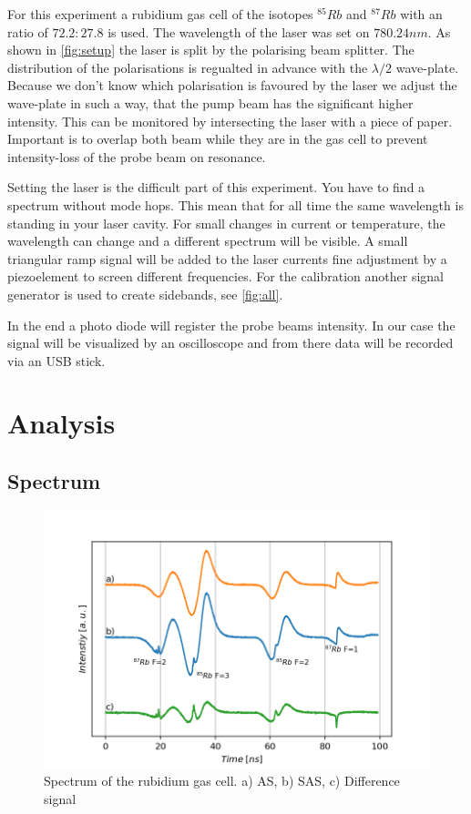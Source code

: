 \documentclass[]{article}
\begin{document}
For this experiment a rubidium gas cell of the isotopes $^{85}Rb$ and $^{87}Rb$ with an ratio of $72.2 : 27.8$ is used. The wavelength of the laser was set on $780.24nm$. As shown in \autoref{fig:setup} the laser is split by the polarising beam splitter. The distribution of the polarisations is regualted in advance with the $\lambda/2$ wave-plate. Because we don't know which polarisation is favoured by the laser we adjust the wave-plate in such a way, that the pump beam has the significant higher intensity. This can be monitored by intersecting the laser with a piece of paper. Important is to overlap both beam while they are in the gas cell to prevent intensity-loss of the probe beam on resonance.

Setting the laser is the difficult part of this experiment. You have to find a spectrum without mode hops. This mean that for all time the same wavelength is standing in your laser cavity. For small changes in current or temperature, the wavelength can change and a different spectrum will be visible. A small triangular ramp signal will be added to the laser currents fine adjustment by a piezoelement to screen different frequencies. For the calibration another signal generator is used to create sidebands, see \autoref{fig:all}.

In the end a photo diode will register the probe beams intensity. In our case the signal will be visualized by an oscilloscope and from there data will be recorded via an USB stick.



\newpage
\section{Analysis}
\subsection{Spectrum}
\begin{figure}[H]
\centering
\includegraphics[width=.8\textwidth]{Plots/Diff_Signal.png}
\caption{Spectrum of the rubidium gas cell. a) AS, b) SAS, c) Difference signal}
\label{fig:signals}
\end{figure}
\end{document}
